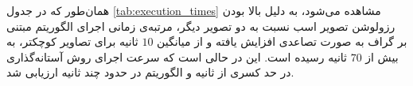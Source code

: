 \vspace{0.5cm}

\begin{notebox}
همان‌طور که در جدول \ref{tab:execution_times} مشاهده می‌شود، به دلیل بالا بودن رزولوشن تصویر اسب نسبت به دو تصویر دیگر، مرتبه‌ی زمانی اجرای الگوریتم مبتنی بر گراف به صورت تصاعدی افزایش یافته و از میانگین $10$ ثانیه برای تصاویر کوچکتر، به بیش از $70$ ثانیه رسیده است. این در حالی است که سرعت اجرای روش آستانه‌گذاری در حد کسری از ثانیه و الگوریتم  در حدود چند ثانیه ارزیابی شد.
\end{notebox}